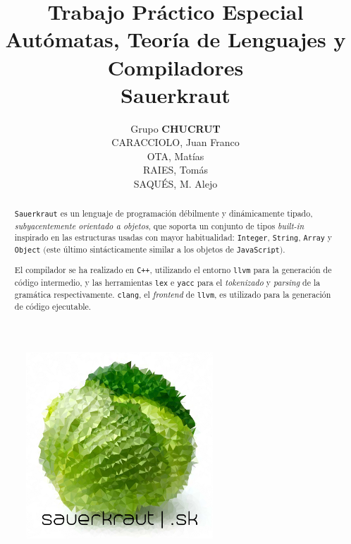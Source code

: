 \documentclass[12pt]{article}
\begin{document}
	\title{\textbf{Trabajo Práctico Especial}\\ Autómatas, Teoría de Lenguajes y Compiladores \\ \textbf{Sauerkraut}}
	\author{Grupo \textbf{CHUCRUT} \\ CARACCIOLO, Juan Franco \\ OTA, Matías \\ RAIES, Tomás \\ SAQUÉS, M. Alejo}
	\date{}
	\maketitle
	
	\begin{abstract}
		\verb|Sauerkraut| es un lenguaje de programación débilmente y dinámicamente tipado, \textit{subyacentemente orientado a objetos}, que soporta un conjunto de tipos \textit{built-in} inspirado en las estructuras usadas con mayor habitualidad: \verb|Integer|, \verb|String|, \verb|Array| y \verb|Object| $($este último sintácticamente similar a los objetos de \verb|JavaScript|$)$.
		
		El compilador se ha realizado en \verb|C++|, utilizando el entorno \verb|llvm| para la generación de código intermedio, y las herramientas \verb|lex| e \verb|yacc| para el \textit{tokenizado} y \textit{parsing} de la gramática respectivamente. \verb|clang|, el \textit{frontend} de \verb|llvm|, es utilizado para la generación de código ejecutable.
	\end{abstract}
	
	\begin{figure}[h]
		\centering
		\includegraphics[width=7cm]{sklogo.png}
	\end{figure}
	
	
	\newpage
	
	\tableofcontents
	
\end{document}
